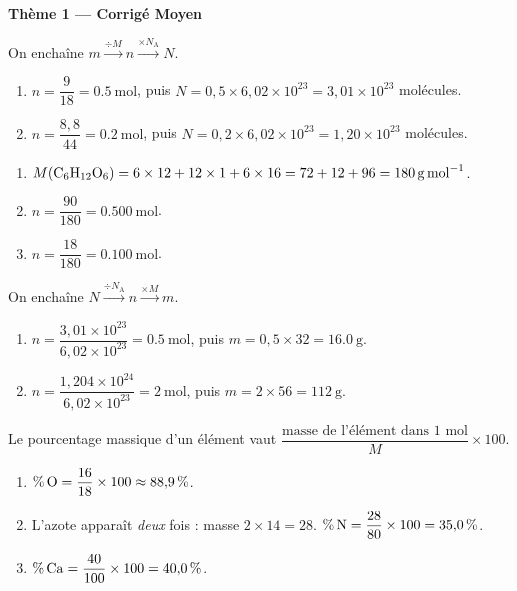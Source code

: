 \documentclass[11pt,a4paper]{article}
\begin{document}
\begin{center}{\large\bfseries\color{primarydark} Thème 1 — Corrigé Moyen}\end{center}

\begin{corrige}
On enchaîne $m \xrightarrow{\div M} n \xrightarrow{\times N_{\mathrm{A}}} N$.
\begin{enumerate}[label=\alph*)]
  \item $n = \dfrac{9}{18} = \SI{0.5}{\mole}$, puis $N = 0{,}5\times 6{,}02\times10^{23}
        = 3{,}01\times10^{23}$ molécules.
  \item $n = \dfrac{8{,}8}{44} = \SI{0.2}{\mole}$, puis $N = 0{,}2\times 6{,}02\times10^{23}
        = 1{,}20\times10^{23}$ molécules.
\end{enumerate}
\end{corrige}

\begin{corrige}
\begin{enumerate}[label=\alph*)]
  \item $M(\ce{C6H12O6}) = 6\times 12 + 12\times 1 + 6\times 16 = 72+12+96 = \SI{180}{\gram\per\mole}$.
  \item $n = \dfrac{90}{180} = \SI{0.500}{\mole}$.
  \item $n = \dfrac{18}{180} = \SI{0.100}{\mole}$.
\end{enumerate}
\end{corrige}

\begin{corrige}
On enchaîne $N \xrightarrow{\div N_{\mathrm{A}}} n \xrightarrow{\times M} m$.
\begin{enumerate}[label=\alph*)]
  \item $n = \dfrac{3{,}01\times10^{23}}{6{,}02\times10^{23}} = \SI{0.5}{\mole}$, puis
        $m = 0{,}5\times 32 = \SI{16.0}{\gram}$.
  \item $n = \dfrac{1{,}204\times10^{24}}{6{,}02\times10^{23}} = \SI{2}{\mole}$, puis
        $m = 2\times 56 = \SI{112}{\gram}$.
\end{enumerate}
\end{corrige}

\begin{corrige}
Le pourcentage massique d'un élément vaut $\dfrac{\text{masse de l'élément dans 1 mol}}{M}\times 100$.
\begin{enumerate}[label=\alph*)]
  \item $\%\,\ce{O} = \dfrac{16}{18}\times 100 \approx 88{,}9\,\%$.
  \item L'azote apparaît \emph{deux} fois : masse $2\times 14 = 28$. $\%\,\ce{N} = \dfrac{28}{80}\times 100 = 35{,}0\,\%$.
  \item $\%\,\ce{Ca} = \dfrac{40}{100}\times 100 = 40{,}0\,\%$.
\end{enumerate}
\end{corrige}
\end{document}

